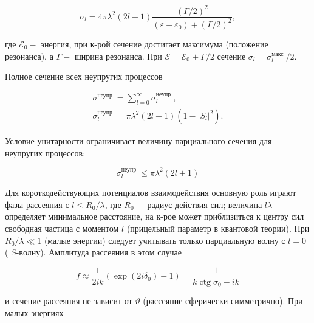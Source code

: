 \documentclass[10pt]{article}
\begin{document}
\[

\sigma_{l}=4 \pi \lambda^{2}(2 l+1) \frac{(\Gamma / 2)^{2}}{\left(\varepsilon-\varepsilon_{0}\right)+(\Gamma / 2)^{2}},

\]



где $\mathscr{E}_{0}-$ энергия, при к-рой сечение достигает максимума (положение резонанса), а $\Gamma-$ ширина резонанса. При $\mathscr{E}=\mathscr{E}_{0}+\Gamma / 2$ сечение $\sigma_{l}=\sigma_{l}^{\text {макс }} / 2$.



Полное сечение всех неупругих процессов



\[

\begin{gathered}

\sigma^{\text {неупр }}=\sum_{l=0}^{\infty} \sigma_{l}^{\text {неупр }}, \\

\sigma_{l}^{\text {неупр }}=\pi \lambda^{2}(2 l+1)\left(1-\left|S_{l}\right|^{2}\right) .

\end{gathered}

\]



Условие унитарности ограничивает величину парциального сечения для неупругих процессов:



\[

\sigma_{l}^{\text {неупр }} \leqslant \pi \lambda^{2}(2 l+1)

\]



Для короткодействующих потенциалов взаимодействия основную роль играют фазы рассеяния с $l \leqslant R_{0} / \lambda$, где $R_{0}-$ радиус действия сил; величина $l \lambda$ определяет минимальное расстояние, на к-рое может приблизиться к центру сил свободная частица с моментом $l$ (прицельный параметр в квантовой теории). При $R_{0} / \lambda \ll 1$ (малые энергии) следует учитывать только парциальную волну с $l=0$ ( $S$-волну). Амплитуда рассеяния в этом случае



\[

f \approx \frac{1}{2 i k}\left(\exp \left(2 i \delta_{0}\right)-1\right)=\frac{1}{k \operatorname{ctg} \sigma_{0}-i k}

\]



и сечение рассеяния не зависит от $\vartheta$ (рассеяние сферически симметрично). При малых энергиях
\end{document}
